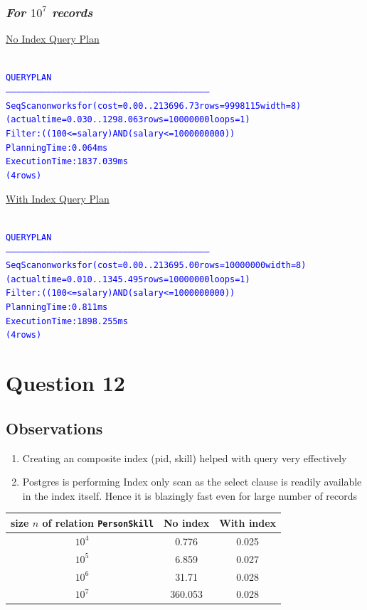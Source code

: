\documentclass{article}
\begin{document}
    \subsubsection*{\emph{For $10^7$ records}}
    \underline{No Index Query Plan}
    \begin{center}
      {\tiny
      \begin{alltt}
      \textcolor{blue}{
        QUERY PLAN                                                       
        -----------------------------------------------------------------------------------------------------------------------
         Seq Scan on worksfor  (cost=0.00..213696.73 rows=9998115 width=8) (actual time=0.030..1298.063 rows=10000000 loops=1)
           Filter: ((100 <= salary) AND (salary <= 1000000000))
         Planning Time: 0.064 ms
         Execution Time: 1837.039 ms
        (4 rows)
       }
      \end{alltt}
      }
    \end{center}
    \underline{With Index Query Plan}
    \begin{center}
      {\tiny
      \begin{alltt}
      \textcolor{blue}{
        QUERY PLAN                                                       
        ------------------------------------------------------------------------------------------------------------------------
         Seq Scan on worksfor  (cost=0.00..213695.00 rows=10000000 width=8) (actual time=0.010..1345.495 rows=10000000 loops=1)
           Filter: ((100 <= salary) AND (salary <= 1000000000))
         Planning Time: 0.811 ms
         Execution Time: 1898.255 ms
        (4 rows)
       }
      \end{alltt}
      }
    \end{center}

  \section*{Question 12}
  \subsection*{Observations}
  \begin{center}
    \begin{enumerate}
      \item Creating an composite index (pid, skill) helped with query very effectively
      \item Postgres is performing Index only scan as the select clause is readily available in the index itself. Hence it is blazingly fast even for large number of records
    \end{enumerate}
    {\normalsize
      \begin{tabular}{c|c|c}
      size $n$ of relation {\tt PersonSkill} & No index & With index \\ \hline
      $10^4$ & 0.776 & 0.025\\
      $10^5$ & 6.859 &  0.027\\
      $10^6$ & 31.71 &  0.028\\
      $10^7$ & 360.053 & 0.028\\
      \end{tabular}
    }
    \end{center}
\end{document}

